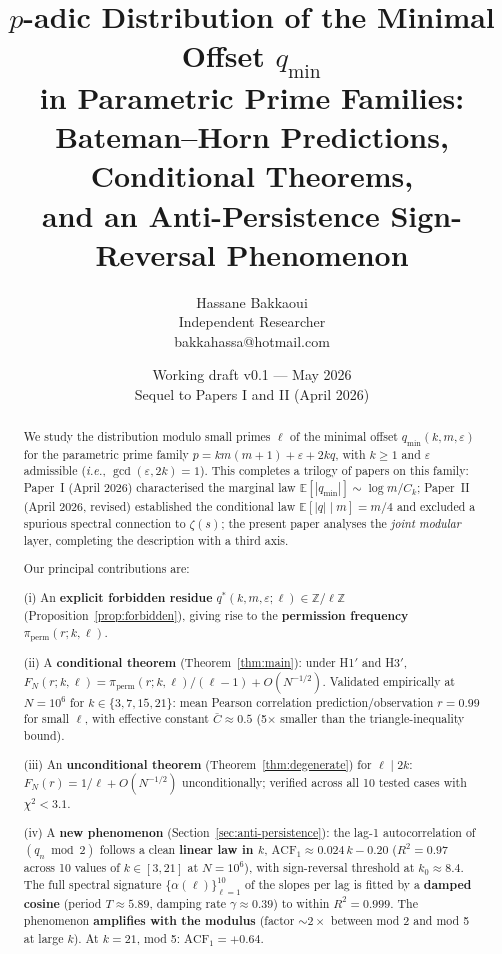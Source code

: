 \documentclass[11pt,a4paper]{article}
\title{\large $p$-adic Distribution of the Minimal Offset $q_{\min}$\\
in Parametric Prime Families:\\[3pt]
\Large Bateman--Horn Predictions, Conditional Theorems,\\
and an Anti-Persistence Sign-Reversal Phenomenon}
\author{Hassane Bakkaoui\\\small Independent Researcher\\\small bakkahassa@hotmail.com}
\date{Working draft v0.1 --- May 2026\\\small Sequel to Papers I and II (April 2026)}
\theoremstyle{plain}
\theoremstyle{definition}
\newcommand{\qmin}{q_{\min}}
\newcommand{\Z}{\mathbb{Z}}
\newcommand{\PiP}{\pi_{\mathrm{perm}}}
\newcommand{\eps}{\varepsilon}
\begin{document}
\maketitle

\begin{abstract}
We study the distribution modulo small primes $\ell$ of the minimal offset
$\qmin(k, m, \eps)$ for the parametric prime family
$p = km(m+1) + \eps + 2kq$, with $k \ge 1$ and $\eps$ admissible
(\textit{i.e.}, $\gcd(\eps, 2k) = 1$). This completes a trilogy of papers on
this family: Paper~I (April 2026) characterised the marginal law
$\mathbb{E}[|\qmin|] \sim \log m / C_k$; Paper~II (April 2026, revised)
established the conditional law $\mathbb{E}[|q| \mid m] = m/4$ and excluded a
spurious spectral connection to $\zeta(s)$; the present paper analyses the
\emph{joint modular} layer, completing the description with a third axis.

\smallskip
\noindent Our principal contributions are:

\smallskip
(i) An \textbf{explicit forbidden residue} $q^*(k, m, \eps; \ell) \in \Z/\ell\Z$
(Proposition~\ref{prop:forbidden}), giving rise to the \textbf{permission frequency}
$\PiP(r; k, \ell)$.

\smallskip
(ii) A \textbf{conditional theorem} (Theorem~\ref{thm:main}): under H1$'$ and
H3$'$, $F_N(r; k, \ell) = \PiP(r; k, \ell)/(\ell-1) + O(N^{-1/2})$. Validated
empirically at $N = 10^6$ for $k \in \{3, 7, 15, 21\}$: mean Pearson correlation
prediction/observation $r = 0.99$ for small $\ell$, with effective constant
$\bar C \approx 0.5$ (5$\times$ smaller than the triangle-inequality bound).

\smallskip
(iii) An \textbf{unconditional theorem} (Theorem~\ref{thm:degenerate}) for
$\ell \mid 2k$: $F_N(r) = 1/\ell + O(N^{-1/2})$ unconditionally; verified across
all 10 tested cases with $\chi^2 < 3.1$.

\smallskip
(iv) A \textbf{new phenomenon} (Section~\ref{sec:anti-persistence}): the lag-1
autocorrelation of $(q_n \bmod 2)$ follows a clean \textbf{linear law in $k$},
$\mathrm{ACF}_1 \approx 0.024\,k - 0.20$ ($R^2 = 0.97$ across 10 values of
$k \in [3, 21]$ at $N = 10^6$), with sign-reversal threshold at $k_0 \approx 8.4$.
The full spectral signature $\{\alpha(\ell)\}_{\ell=1}^{10}$ of the slopes per
lag is fitted by a \textbf{damped cosine} (period $T \approx 5.89$, damping
rate $\gamma \approx 0.39$) to within $R^2 = 0.999$. The phenomenon
\textbf{amplifies with the modulus} (factor $\sim 2\times$ between mod 2 and
mod 5 at large $k$). At $k=21$, mod 5: $\mathrm{ACF}_1 = +0.64$.


\end{abstract}
\end{document}
